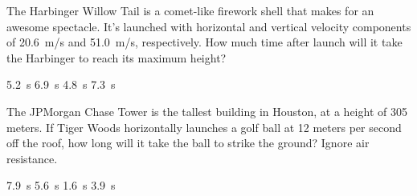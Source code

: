 \documentclass[../main-physics-workbook.tex]{subfiles}
\begin{document}
\begin{questions}
\question
The Harbinger Willow Tail is a comet-like firework shell that makes for an awesome spectacle. It's launched with horizontal and vertical velocity components of \SI{20.6}{m/s} and \SI{51.0}{m/s}, respectively. How much time after launch will it take the Harbinger to reach its maximum height?

\begin{randomizechoices}
    \correctchoice \SI{5.2}{s}
    \choice \SI{6.9}{s}
    \choice \SI{4.8}{s}
    \choice \SI{7.3}{s}
\end{randomizechoices}



\clearpage

\question \label{EJzjXh}
The JPMorgan Chase Tower is the tallest building in Houston, at a height of 305 meters. If Tiger Woods horizontally launches a golf ball at 12 meters per second off the roof, how long will it take the ball to strike the ground? Ignore air resistance.

\begin{minipage}{6cm}
    \centering
    \begin{randomizechoices}
        \correctchoice \SI{7.9}{s}
        \choice \SI{5.6}{s}
        \choice \SI{1.6}{s}
        \choice \SI{3.9}{s}
    \end{randomizechoices}
\end{minipage}%
\begin{minipage}{6cm}
    \centering
    \begin{center}
    \end{center}
\end{minipage}


\end{questions}
\end{document}
